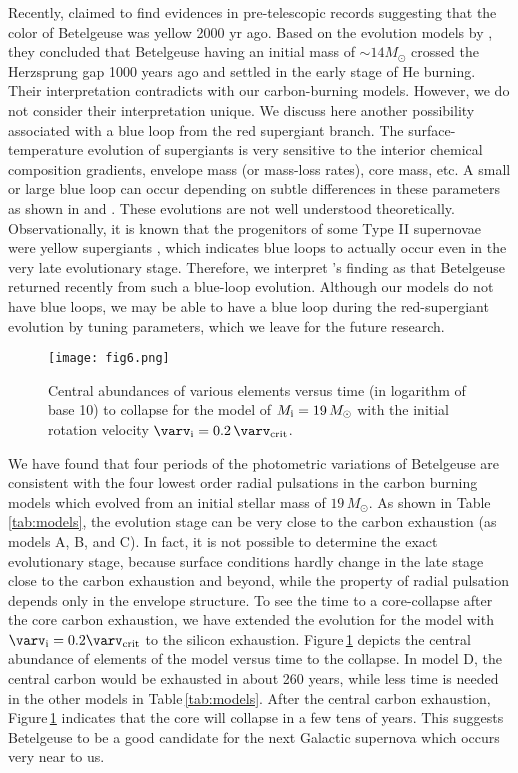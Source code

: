 \documentclass[fleqn,usenatbib]{mnras}
\begin{document}
Recently, \citet{Neuhauser2022} claimed to find evidences in pre-telescopic records suggesting that the color of Betelgeuse was yellow 2000 yr ago. 
Based on the evolution models by \citet{Choi2016}, they concluded that 
Betelgeuse having an initial mass of $\sim14M_\odot$
crossed the Herzsprung gap 1000 years ago and settled in the early stage of He burning. Their interpretation contradicts with our carbon-burning models.    
However, we do not consider their interpretation unique.
We discuss here another possibility associated with a blue loop 
from the red supergiant branch.
The surface-temperature evolution of supergiants is very sensitive to the interior chemical composition gradients, envelope mass (or mass-loss rates), core mass, etc.
A small or large blue loop can occur depending on subtle differences in these
parameters as shown in \citet{Georgy2012} and \citet{Meynet2013,Meynet2015}.
These evolutions are not well understood theoretically. 
Observationally, it is known that the progenitors of some Type II supernovae were yellow supergiants \citep{Georgy2012,Smartt2015}, which indicates blue loops to actually occur even in the very late evolutionary stage. 
Therefore, we interpret \citet{Neuhauser2022}'s finding 
as that Betelgeuse returned recently from such a blue-loop evolution. 
Although our models do not have blue loops, we may be able to have a blue loop 
during the red-supergiant evolution by tuning parameters, which we leave for the future
research. 


\begin{figure}
\texttt{[image: fig6.png]}  %
\caption{Central abundances of various elements versus time (in logarithm of base 10)
 to collapse for the model of $M_{\rm i}=19\,M_\odot$ with the initial rotation 
velocity $\varv_{\rm i}=0.2\,\varv_{\rm crit}$. }
\label{fig:cent_abun}
\end{figure}

We have found that four periods of the photometric variations of Betelgeuse
are consistent with the four lowest order radial pulsations in the carbon burning
models which evolved from an initial stellar mass of $19\,M_\odot$.
As shown in Table\,\ref{tab:models}, the evolution stage can be very close to 
the carbon exhaustion (as models A, B, and C). 
In fact, it is not possible to determine the exact evolutionary stage, because
surface conditions hardly change in the late stage close to the carbon exhaustion
and beyond, while the property of radial pulsation depends only in the envelope
structure. 
To see the time to a core-collapse after the core carbon exhaustion, we have
extended the evolution for the model with $\varv_{\rm i} = 0.2\varv_{\rm crit}$ to
the silicon exhaustion. 
Figure\,\ref{fig:cent_abun} depicts the central abundance of
elements of the model versus time to the collapse.
In model D, the central carbon would be exhausted in about 260 years, while less time is needed in the other models in Table\,\ref{tab:models}.
After the central carbon exhaustion, Figure\,\ref{fig:cent_abun} indicates that 
the core will collapse in a few tens of years.
This suggests 
Betelgeuse to be a good candidate for the next Galactic 
supernova which occurs very near to us.
\end{document}
